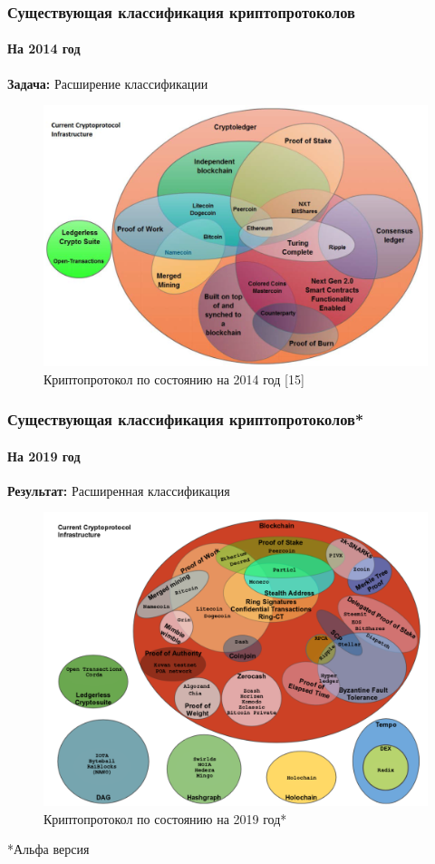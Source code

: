 \documentclass{beamer}
\begin{document}
\begin{frame}
    \frametitle{Существующая классификация криптопротоколов}
    \framesubtitle{На 2014 год}
    \textbf{Задача: } Расширение классификации

    \begin{figure}
        \includegraphics[width=0.75\columnwidth]{current_protocols.png}
        \caption{Криптопротокол по состоянию на 2014 год [15]}
    \end{figure}
\end{frame}

\begin{frame}
    \frametitle{Существующая классификация криптопротоколов*}
    \framesubtitle{На 2019 год}
    \textbf{Результат: } Расширенная классификация

    \begin{figure}
        \includegraphics[width=0.65\columnwidth]{myprotocol_w_title.png}
        \caption{Криптопротокол по состоянию на 2019 год*}
    \end{figure}
    \begin{flushright}
        \vspace{-0.5cm}
        \tiny
        *Альфа версия
    \end{flushright}
\end{frame}
\end{document}
